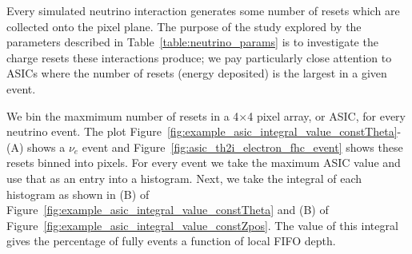 Every simulated neutrino interaction generates some number of resets which are collected onto the pixel plane.
The purpose of the study explored by the parameters described in Table~\ref{table:neutrino_params} is to investigate the charge resets these interactions produce; we pay particularly close attention to ASICs where the number of resets (energy deposited) is the largest in a given event.

We bin the maxmimum number of resets in a 4$\times$4 pixel array, or ASIC, for every neutrino event.
The plot Figure~\ref{fig:example_asic_integral_value_constTheta}-(A) shows a $\nu_{e}$ event and Figure~\ref{fig:asic_th2i_electron_fhc_event} shows these resets binned into pixels.
For every event we take the maximum ASIC value and use that as an entry into a histogram.
Next, we take the integral of each histogram as shown in (B) of Figure~\ref{fig:example_asic_integral_value_constTheta} and (B) of Figure~\ref{fig:example_asic_integral_value_constZpos}.
The value of this integral gives the percentage of fully events a function of local FIFO depth.

